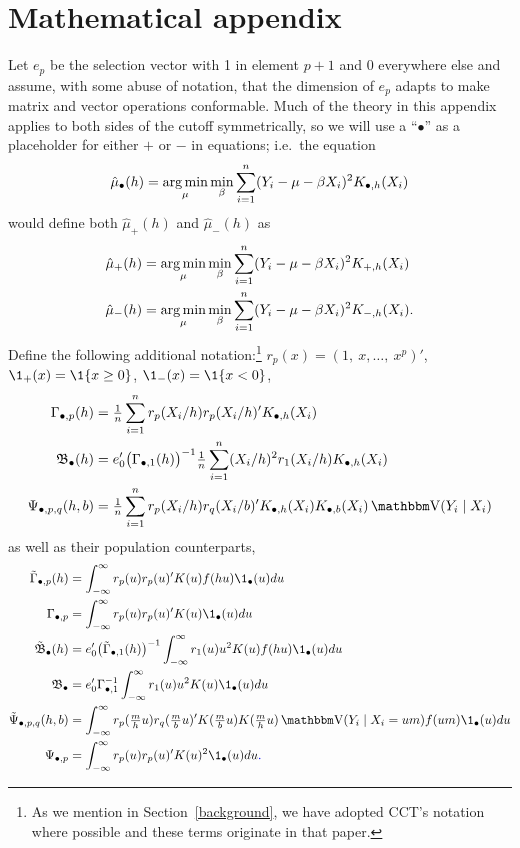 \documentclass[12pt,fleqn]{article}
\providecommand{\DIFadd}[1]{{\protect\color{blue}\uwave{#1}}} %
\providecommand{\DIFaddbegin}{} %
\providecommand{\DIFaddend}{} %
\begin{document}
\section{Mathematical appendix}
Let $e_p$ be the selection vector with 1 in element $p+1$ and 0
everywhere else and assume, with some abuse of notation, that the
dimension of $e_p$ adapts to make matrix and vector operations
conformable. Much of the theory in this appendix applies to both
sides of the cutoff symmetrically, so we will use a ``$\bullet$'' as a
placeholder for either $+$ or $-$ in equations; i.e.\ the equation
\[
  \hat\mu_\bullet(h) = \operatorname*{arg\,min}_{\mu} \min_{\beta} \sum_{i=1}^n
  (Y_i - \mu - \beta X_i)^2 K_{\bullet,h}(X_i)
\]
would define both $\hat\mu_+(h)$ and $\hat\mu_-(h)$ as
\begin{align*}
  \hat\mu_+(h) &= \operatorname*{arg\,min}_{\mu} \min_{\beta} \sum_{i=1}^n
  (Y_i - \mu - \beta X_i)^2 K_{+,h}(X_i) \\
  \hat\mu_-(h) &= \operatorname*{arg\,min}_{\mu} \min_{\beta} \sum_{i=1}^n
  (Y_i - \mu - \beta X_i)^2 K_{-,h}(X_i).
\end{align*}
Define the following additional notation:\footnote{%
  As we mention in Section~\ref{background}, we have adopted CCT's
  notation where possible and these terms originate in that paper.} %
$r_p(x) = (1,\ x,\dots,\ x^p)'$, $\1_+(x) = \1\{x \geq 0\}$, $\1_-(x) = \1\{x < 0\}$,
\begin{align*}
  \Gamma_{\bullet,p}(h)
  &= \tfrac{1}{n} \sum_{i=1}^n r_p(X_i/h) r_p(X_i/h)' K_{\bullet,h}(X_i) \\
  \Bf_\bullet(h)
  & = e_0' \big(\Gamma_{\bullet,1}(h)\big)^{-1}
    \tfrac{1}{n} \sum_{i=1}^n (X_i / h)^2 r_1(X_i/h) K_{\bullet,h}(X_i) \\
  \Psi_{\bullet,p,q}(h,b)
  &= \tfrac{1}{n} \sum_{i=1}^n r_p(X_i/h) r_q(X_i/b)'
     K_{\bullet,h}(X_i) K_{\bullet,b}(X_i) \V(Y_i \mid X_i)
\end{align*}
as well as their population counterparts,
\begin{align*}
  \Gammat_{\bullet,p}(h) &= \int_{-\infty}^\infty   r_p(u) r_p(u)' K(u) f(h u) \1_\bullet(u) du \\
  \Gamma_{\bullet,p} &= \int_{-\infty}^\infty   r_p(u) r_p(u)' K(u) \1_\bullet(u) du \\
  \Bft_\bullet(h) & = e_0' \big(\Gammat_{\bullet,1}(h)\big)^{-1}
    \int_{-\infty}^\infty r_1(u) u^2 K(u) f(h u) \1_\bullet(u) du \\
  \Bf_\bullet & = e_0' \Gamma_{\bullet,1}^{-1} \int_{-\infty}^\infty r_1(u) u^2 K(u) \1_\bullet(u) du \\
  \Psit_{\bullet,p,q}(h,b) &= \int_{-\infty}^\infty
     r_p(\tfrac{m}{h} u) r_q(\tfrac{m}{b} u)' K(\tfrac{m}{b} u) K(\tfrac{m}{h} u)
     \V(Y_i \mid X_i = um) f(um) \1_\bullet(u) du \\
  \Psi_{\bullet,p} &= \int_{-\infty}^\infty
     r_p(u) r_p(u)' K(u)^2 \1_\bullet(u) du\DIFaddbegin \DIFadd{.
}\DIFaddend \end{align*}
\end{document}

